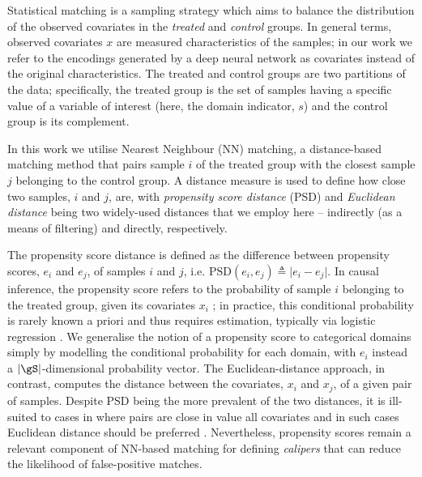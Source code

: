 Statistical matching is a sampling strategy which aims to balance the distribution of the observed
covariates in the \emph{treated} and \emph{control} groups. In general terms, observed covariates
$x$ are measured characteristics of the samples; in our work we refer to the encodings generated by
a deep neural network as covariates instead of the original characteristics. 
%
The treated and control groups are two partitions of the data; specifically, the treated group is
the set of samples having a specific value of a variable of interest (here, the domain indicator,
$s$) and the control group is its complement.

In this work we utilise Nearest Neighbour (NN) matching, a distance-based matching method that pairs
sample $i$ of the treated group with the closest sample $j$ belonging to the control group.
%
A distance measure is used to define how close two samples, $i$ and $j$, are, with \emph{propensity
score distance} (PSD) and \emph{Euclidean distance} being two widely-used distances that we employ
here
-- indirectly (as a means of filtering) and directly, respectively.

The propensity score distance is defined as the difference between propensity scores, $e_i$
and $e_j$, of samples $i$ and $j$, i.e. \( \mathrm{PSD}(e_i, e_j) \triangleq \vert e_i - e_j \vert \). 
%
In causal inference, the propensity score refers to the probability of sample $i$ belonging to the
treated group, given its covariates $x_i$ \cite{rosenbaum1983central}; in practice, this
conditional probability is rarely known a priori and thus requires estimation, typically via
logistic regression \cite{stuart2010matching}. 
%
We generalise the notion of a propensity score to categorical domains simply by modelling the
conditional probability for each domain, with  $e_i$ instead a \( |\gS| \)-dimensional probability
vector.
%
The Euclidean-distance approach, in contrast, computes the distance between the covariates,
$x_i$ and $x_j$, of a given pair of samples.
%
Despite PSD being the more prevalent of the two distances, it is ill-suited to cases in where pairs
are close in value \wrt{} all covariates and in such cases Euclidean distance should be preferred
\cite{king2019propensity}. 
%
Nevertheless, propensity scores remain a relevant component of NN-based matching for defining
\emph{calipers} that can reduce the likelihood of false-positive matches.
%

